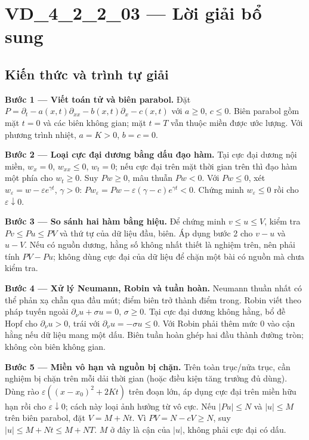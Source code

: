 \documentclass[10pt,a4paper]{article}
\begin{document}
\section*{VD\_4\_2\_2\_03 — Lời giải bổ sung}
\subsection*{Kiến thức và trình tự giải}
\textbf{Bước 1 — Viết toán tử và biên parabol.} Đặt $P=\partial_t-a(x,t)\partial_{xx}-b(x,t)\partial_x-c(x,t)$ với $a\ge0$, $c\le0$. Biên parabol gồm mặt $t=0$ và các biên không gian; mặt $t=T$ vẫn thuộc miền được ước lượng. Với phương trình nhiệt, $a=K>0$, $b=c=0$.

\textbf{Bước 2 — Loại cực đại dương bằng dấu đạo hàm.} Tại cực đại dương nội miền, $w_x=0$, $w_{xx}\le0$, $w_t=0$; nếu cực đại trên mặt thời gian trên thì đạo hàm một phía cho $w_t\ge0$. Suy $Pw\ge0$, mâu thuẫn $Pw<0$. Với $Pw\le0$, xét $w_\varepsilon=w-\varepsilon e^{\gamma t}$, $\gamma>0$: $Pw_\varepsilon=Pw-\varepsilon(\gamma-c)e^{\gamma t}<0$. Chứng minh $w_\varepsilon\le0$ rồi cho $\varepsilon\downarrow0$.

\textbf{Bước 3 — So sánh hai hàm bằng hiệu.} Để chứng minh $v\le u\le V$, kiểm tra $Pv\le Pu\le PV$ và thứ tự của dữ liệu đầu, biên. Áp dụng bước 2 cho $v-u$ và $u-V$. Nếu có nguồn dương, hằng số không nhất thiết là nghiệm trên, nên phải tính $PV-Pu$; không dùng cực đại của dữ liệu để chặn một bài có nguồn mà chưa kiểm tra.

\textbf{Bước 4 — Xử lý Neumann, Robin và tuần hoàn.} Neumann thuần nhất có thể phản xạ chẵn qua đầu mút; điểm biên trở thành điểm trong. Robin viết theo pháp tuyến ngoài $\partial_\nu u+\sigma u=0$, $\sigma\ge0$. Tại cực đại dương không hằng, bổ đề Hopf cho $\partial_\nu u>0$, trái với $\partial_\nu u=-\sigma u\le0$. Với Robin phải thêm mức $0$ vào cận hằng nếu dữ liệu mang một dấu. Biên tuần hoàn ghép hai đầu thành đường tròn; không còn biên không gian.

\textbf{Bước 5 — Miền vô hạn và nguồn bị chặn.} Trên toàn trục/nửa trục, cần nghiệm bị chặn trên mỗi dải thời gian (hoặc điều kiện tăng trưởng đủ dùng). Dùng rào $\varepsilon((x-x_0)^2+2Kt)$ trên đoạn lớn, áp dụng cực đại trên miền hữu hạn rồi cho $\varepsilon\downarrow0$; cách này loại ảnh hưởng từ vô cực. Nếu $|Pu|\le N$ và $|u|\le M$ trên biên parabol, đặt $V=M+Nt$. Vì $PV=N-cV\ge N$, suy $|u|\le M+Nt\le M+NT$. $M$ ở đây là cận của $|u|$, không phải cực đại có dấu.
\end{document}
